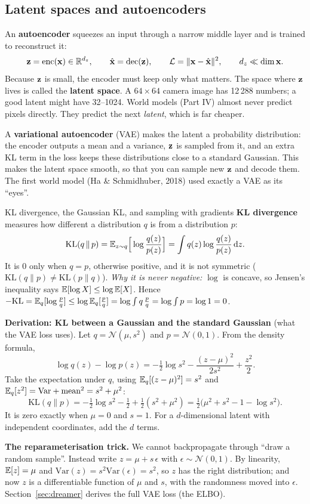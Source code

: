 \subsection{Latent spaces and autoencoders}
An \textbf{autoencoder} squeezes an input through a narrow middle layer and is trained to reconstruct it:
\begin{equation}
\mathbf{z}=\mathrm{enc}(\mathbf{x})\in\mathbb{R}^{d_z},\qquad \hat{\mathbf{x}}=\mathrm{dec}(\mathbf{z}),\qquad \mathcal L=\lVert \mathbf{x}-\hat{\mathbf{x}}\rVert^2,\qquad d_z\ll \dim\mathbf{x} .
\end{equation}
Because $\mathbf{z}$ is small, the encoder must keep only what matters. The space where $\mathbf{z}$ lives is called the \textbf{latent space}. A $64\times64$ camera image has 12\,288 numbers; a good latent might have 32--1024. World models (Part IV) almost never predict pixels directly. They predict the next \emph{latent}, which is far cheaper.

A \textbf{variational autoencoder} (VAE) makes the latent a probability distribution: the encoder outputs a mean and a variance, $\mathbf{z}$ is sampled from it, and an extra KL term in the loss keeps these distributions close to a standard Gaussian. This makes the latent space smooth, so that you can sample new $\mathbf{z}$ and decode them. The first world model (Ha \& Schmidhuber, 2018) used exactly a VAE as its ``eyes''.

\begin{probbox}{KL divergence, the Gaussian KL, and sampling with gradients}
\textbf{KL divergence} measures how different a distribution $q$ is from a distribution $p$:
\[
\mathrm{KL}(q\,\|\,p)=\mathbb{E}_{z\sim q}\Big[\log\frac{q(z)}{p(z)}\Big]=\int q(z)\log\frac{q(z)}{p(z)}\,\mathrm dz .
\]
It is $0$ only when $q=p$, otherwise positive, and it is not symmetric ($\mathrm{KL}(q\|p)\ne\mathrm{KL}(p\|q)$). \emph{Why it is never negative:} $\log$ is concave, so Jensen's inequality says $\mathbb{E}[\log X]\le\log\mathbb{E}[X]$. Hence $-\mathrm{KL}=\mathbb{E}_q[\log\tfrac pq]\le\log\mathbb{E}_q[\tfrac pq]=\log\int q\,\tfrac pq=\log\int p=\log1=0$.

\textbf{Derivation: KL between a Gaussian and the standard Gaussian} (what the VAE loss uses). Let $q=\mathcal N(\mu,s^2)$ and $p=\mathcal N(0,1)$. From the density formula,
\[
\log q(z)-\log p(z)=-\tfrac12\log s^2-\frac{(z-\mu)^2}{2s^2}+\frac{z^2}{2}.
\]
Take the expectation under $q$, using $\mathbb{E}_q[(z-\mu)^2]=s^2$ and $\mathbb{E}_q[z^2]=\mathrm{Var}+\text{mean}^2=s^2+\mu^2$:
\[
\mathrm{KL}(q\|p)=-\tfrac12\log s^2-\tfrac12+\tfrac12(s^2+\mu^2)=\tfrac12\big(\mu^2+s^2-1-\log s^2\big).
\]
It is zero exactly when $\mu=0$ and $s=1$. For a $d$-dimensional latent with independent coordinates, add the $d$ terms.

\textbf{The reparameterisation trick.} We cannot backpropagate through ``draw a random sample''. Instead write $z=\mu+s\,\epsilon$ with $\epsilon\sim\mathcal N(0,1)$. By linearity, $\mathbb{E}[z]=\mu$ and $\mathrm{Var}(z)=s^2\mathrm{Var}(\epsilon)=s^2$, so $z$ has the right distribution; and now $z$ is a differentiable function of $\mu$ and $s$, with the randomness moved into $\epsilon$. Section~\ref{sec:dreamer} derives the full VAE loss (the ELBO).
\end{probbox}


